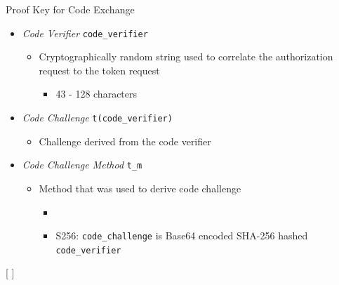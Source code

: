 \documentclass[aspectratio=169]{beamer}
\begin{document}
\begin{frame}{Proof Key for Code Exchange}
	\begin{itemize}
		\item \emph{Code Verifier} \hfill \texttt{code\_verifier}
		\begin{itemize}
			\item Cryptographically random string used to correlate the authorization request to the token request
			\begin{itemize}
				\item 43 - 128 characters
			\end{itemize}
		\end{itemize}
		\pause
		\item \emph{Code Challenge} \hfill \texttt{t(code\_verifier)}
		\begin{itemize}
			\item Challenge derived from the code verifier
		\end{itemize}
		\pause
		\item \emph{Code Challenge Method} \hfill \texttt{t\_m}
		\begin{itemize}
			\item Method that was used to derive code challenge
			\begin{itemize}
				\item {}
				\item S256: \texttt{code\_challenge} is Base64 encoded SHA-256 hashed \texttt{code\_verifier}
			\end{itemize}
		\end{itemize}
	\end{itemize}

\end{frame}

[
	\label{best-practices}
]
\end{document}
